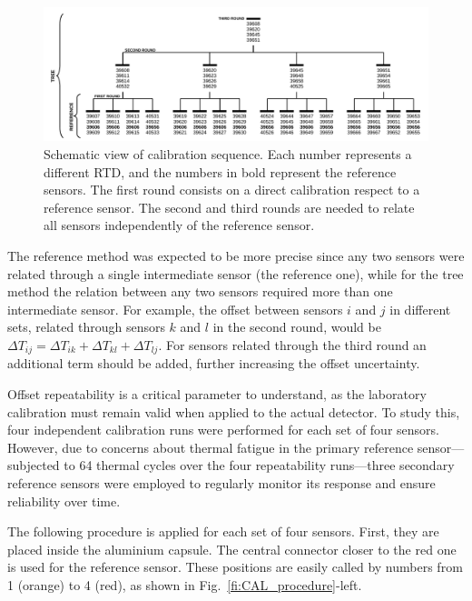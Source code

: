 \begin{figure}[htbp]
\centering
\includegraphics[width=\textwidth]{images/figure_7.pdf}
\caption{Schematic view of calibration sequence. Each number represents a different RTD, and the numbers in bold represent the reference sensors. The first round consists on a direct calibration respect to a reference sensor. The second and third rounds are needed to relate all sensors independently of the reference sensor.
\label{fi:CAL_sequence}}
\end{figure}

The reference method was expected to be more precise since any two sensors were related through a single intermediate sensor (the reference one), while for the tree method the relation between any two sensors required more than one intermediate sensor. For example, the offset between sensors $i$ and $j$ in different sets, related through sensors $k$ and $l$ in the second round, would be $\Delta T_{ij} = \Delta T_{ik} + \Delta T_{kl} + \Delta T_{lj}$. For sensors related through the third round an additional term should be added, further increasing the offset uncertainty.

Offset repeatability is a critical parameter to understand, as the laboratory calibration must remain valid when applied to the actual detector. To study this, four independent calibration runs were performed for each set of four sensors. However, due to concerns about thermal fatigue in the primary reference sensor---subjected to 64 thermal cycles over the four repeatability runs---three secondary reference sensors were employed to regularly monitor its response and ensure reliability over time.

The following procedure is applied for each set of four sensors. First, they are placed inside the aluminium capsule. The central connector closer to the red one is used for the reference sensor. These positions are easily called by numbers from 1 (orange) to 4 (red), as shown in Fig.~\ref{fi:CAL_procedure}-left.

